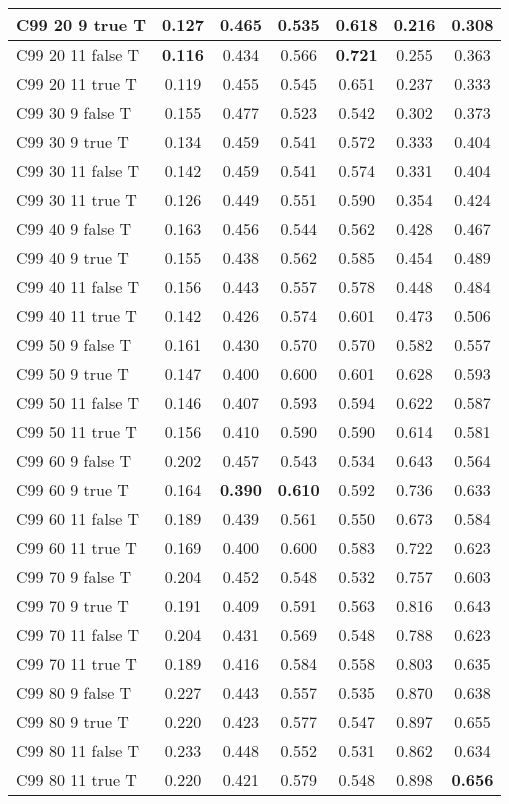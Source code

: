 \documentclass{article}
\begin{document}
\begin{tabular}{|l|c|c|c|c|c|c|}
C99 20  9 true T & 0.127 & 0.465 & 0.535 & 0.618 & 0.216 & 0.308\\ \hline
C99 20 11 false T & \textbf{0.116} & 0.434 & 0.566 & \textbf{0.721} & 0.255 & 0.363\\ \hline
C99 20 11 true T & 0.119 & 0.455 & 0.545 & 0.651 & 0.237 & 0.333\\ \hline
C99 30  9 false T & 0.155 & 0.477 & 0.523 & 0.542 & 0.302 & 0.373\\ \hline
C99 30  9 true T & 0.134 & 0.459 & 0.541 & 0.572 & 0.333 & 0.404\\ \hline
C99 30 11 false T & 0.142 & 0.459 & 0.541 & 0.574 & 0.331 & 0.404\\ \hline
C99 30 11 true T & 0.126 & 0.449 & 0.551 & 0.590 & 0.354 & 0.424\\ \hline
C99 40  9 false T & 0.163 & 0.456 & 0.544 & 0.562 & 0.428 & 0.467\\ \hline
C99 40  9 true T & 0.155 & 0.438 & 0.562 & 0.585 & 0.454 & 0.489\\ \hline
C99 40 11 false T & 0.156 & 0.443 & 0.557 & 0.578 & 0.448 & 0.484\\ \hline
C99 40 11 true T & 0.142 & 0.426 & 0.574 & 0.601 & 0.473 & 0.506\\ \hline
C99 50  9 false T & 0.161 & 0.430 & 0.570 & 0.570 & 0.582 & 0.557\\ \hline
C99 50  9 true T & 0.147 & 0.400 & 0.600 & 0.601 & 0.628 & 0.593\\ \hline
C99 50 11 false T & 0.146 & 0.407 & 0.593 & 0.594 & 0.622 & 0.587\\ \hline
C99 50 11 true T & 0.156 & 0.410 & 0.590 & 0.590 & 0.614 & 0.581\\ \hline
C99 60  9 false T & 0.202 & 0.457 & 0.543 & 0.534 & 0.643 & 0.564\\ \hline
C99 60  9 true T & 0.164 & \textbf{0.390} & \textbf{0.610} & 0.592 & 0.736 & 0.633\\ \hline
C99 60 11 false T & 0.189 & 0.439 & 0.561 & 0.550 & 0.673 & 0.584\\ \hline
C99 60 11 true T & 0.169 & 0.400 & 0.600 & 0.583 & 0.722 & 0.623\\ \hline
C99 70  9 false T & 0.204 & 0.452 & 0.548 & 0.532 & 0.757 & 0.603\\ \hline
C99 70  9 true T & 0.191 & 0.409 & 0.591 & 0.563 & 0.816 & 0.643\\ \hline
C99 70 11 false T & 0.204 & 0.431 & 0.569 & 0.548 & 0.788 & 0.623\\ \hline
C99 70 11 true T & 0.189 & 0.416 & 0.584 & 0.558 & 0.803 & 0.635\\ \hline
C99 80  9 false T & 0.227 & 0.443 & 0.557 & 0.535 & 0.870 & 0.638\\ \hline
C99 80  9 true T & 0.220 & 0.423 & 0.577 & 0.547 & 0.897 & 0.655\\ \hline
C99 80 11 false T & 0.233 & 0.448 & 0.552 & 0.531 & 0.862 & 0.634\\ \hline
C99 80 11 true T & 0.220 & 0.421 & 0.579 & 0.548 & 0.898 & \textbf{0.656}\\ \hline
\end{tabular} 
\end{document}
